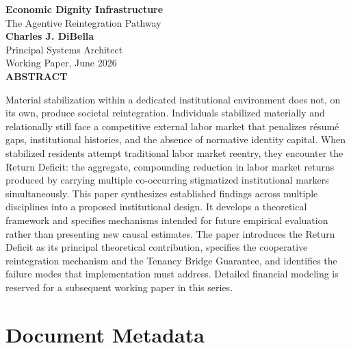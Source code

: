 \documentclass[12pt, letterpaper]{article}
\begin{document}
\captionsetup[table]{labelfont=normalfont, labelsep=period, skip=6pt}

\begin{titlepage}
\begin{center}
{\LARGE \textbf{Economic Dignity Infrastructure}}\\[6pt]
{\large The Agentive Reintegration Pathway}\\[0.5cm]
{\normalsize \textbf{Charles J. DiBella}}\\[0.01cm]
{\normalsize Principal Systems Architect}\\[0.01cm]
{\normalsize Working Paper, June 2026}\\[0.3cm]
\textbf{ABSTRACT}
\vspace{0.2cm}
\end{center}
\begin{minipage}{0.95\textwidth}
\noindent

Material stabilization within a dedicated institutional environment does not, on its own, produce societal reintegration. Individuals stabilized materially and relationally still face a competitive external labor market that penalizes r\'{e}sum\'{e} gaps, institutional histories, and the absence of normative identity capital. When stabilized residents attempt traditional labor market reentry, they encounter the Return Deficit: the aggregate, compounding reduction in labor market returns produced by carrying multiple co-occurring stigmatized institutional markers simultaneously. This paper synthesizes established findings across multiple disciplines into a proposed institutional design. It develops a theoretical framework and specifies mechanisms intended for future empirical evaluation rather than presenting new causal estimates. The paper introduces the Return Deficit as its principal theoretical contribution, specifies the cooperative reintegration mechanism and the Tenancy Bridge Guarantee, and identifies the failure modes that implementation must address. Detailed financial modeling is reserved for a subsequent working paper in this series.

\end{minipage}
\end{titlepage}


\newpage
\section*{Document Metadata}
\end{document}
